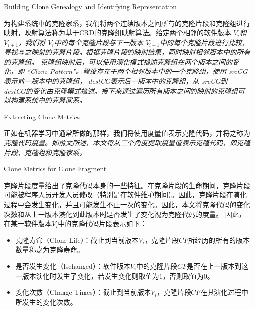 {Building Clone Genealogy and Identifying Representation}

为构建系统中的克隆家系，我们将两个连续版本之间所有的克隆片段和克隆组进行映射，映射算法称为基于CRD的克隆组映射算法\cite{}。给定两个相邻的软件版本\em{ $V_i$}和\em{ $V_ {i + 1}$}，我们将\em{ $V_i$}中的每个克隆片段与下一版本\em{ $ V_{i+1}$}中的每个克隆片段进行比较，寻找与之映射的克隆片段。根据克隆片段的映射结果，同时映射相邻版本中的所有的克隆组。 
克隆组映射后，可以使用演化模式描述克隆组在两个版本之间的变化，即\em{ ``Clone Pattern''}。假设存在于两个相邻版本中的一个克隆组，使用\em{ srcCG}表示前一版本中的克隆组，\em{ destCG}表示后一版本中的克隆组，从\em{ srcCG}到\em{ destCG}的变化由克隆模式描述。接下来通过遍历所有版本之间的映射的克隆组可以构建系统中的克隆家系。


{Extracting Clone Metrics}

正如在机器学习中通常所做的那样，我们将使用度量值表示克隆代码，并将之称为\em{ 克隆代码度量}。如前文所述，本文将从三个角度提取度量值表示克隆代码，即克隆片段、克隆组和克隆家系。

{Clone Metrics for Clone Fragment}

克隆片段度量给出了克隆代码本身的一些特征。在克隆片段的生命期间，克隆片段可能被程序人员开发人员修改（特别是在软件维护期间）。因此，克隆片段在演化过程中会发生变化，并且可能发生不止一次的变化。因此，本文将克隆代码的变化次数和从上一版本演化到此版本时是否发生了变化视为克隆代码的度量。 因此，在某一软件版本$V_ i $中的克隆代码片段表示如下：
\begin{itemize}
\item
克隆寿命（Clone Life）：截止到当前版本$V_ i $，克隆片段$CF$所经历的所有的版本数量称之为克隆寿命。
\item
是否发生变化（Ischanged）：软件版本$V_ i $中的克隆片段$CF$是否在上一版本到这一版本演化时发生了变化，若发生变化则取值为$1$，否则取值为$0$。
\item
变化次数（Change Times）：截止到当前版本$V_ i $，克隆片段$CF$在其演化过程中所发生的变化次数。
\end{itemize}

